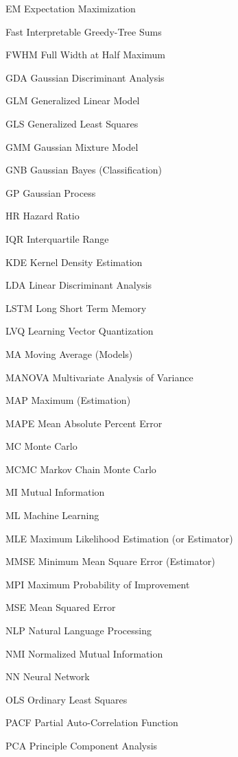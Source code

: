 \begin{symbollist}
  \item[EM] Expectation Maximization
  \item[\figs] Fast Interpretable Greedy-Tree Sums
  \item[FWHM] Full Width at Half Maximum
  \item[GDA] Gaussian Discriminant Analysis
  \item[GLM] Generalized Linear Model
  \item[GLS] Generalized Least Squares
  \item[GMM] Gaussian Mixture Model
  \item[GNB] Gaussian \Naive Bayes (Classification)
  \item[GP] Gaussian Process
  \item[HR] Hazard Ratio
  \item[IQR] Interquartile Range
  \item[KDE] Kernel Density Estimation
  \item[LDA] Linear Discriminant Analysis
  \item[LSTM] Long Short Term Memory
  \item[LVQ] Learning Vector Quantization
  \item[MA] Moving Average (Models)
  \item[MANOVA] Multivariate Analysis of Variance
  \item[MAP] Maximum \aposteriori (Estimation)
  \item[MAPE] Mean Absolute Percent Error
  \item[MC] Monte Carlo
  \item[MCMC] Markov Chain Monte Carlo
  \item[MI] Mutual Information
  \item[ML] Machine Learning
  \item[MLE] Maximum Likelihood Estimation (or Estimator)
  \item[MMSE] Minimum Mean Square Error (Estimator)
  \item[MPI] Maximum Probability of Improvement
  \item[MSE] Mean Squared Error
  \item[NLP] Natural Language Processing
  \item[NMI] Normalized Mutual Information
  \item[NN] Neural Network
  \item[OLS] Ordinary Least Squares
  \item[PACF] Partial Auto-Correlation Function
  \item[PCA] Principle Component Analysis

\end{symbollist}
